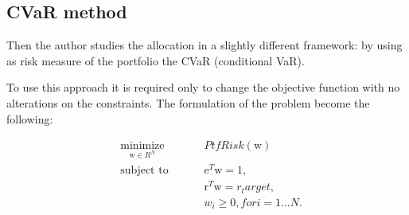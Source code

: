 \begin{table}[H]
    \caption{Results under Mean-Variance optimization, source: \citep{samuele}}
    \label{tabsamuele1}
\end{table}
\bigskip
\subsection{CVaR method}


Then the author studies the allocation in a slightly different framework: by using as risk measure of the portfolio the CVaR (conditional VaR).

To use this approach it is required only to change the objective function with no alterations on the constraints. The formulation of the problem become the following:

\begin{equation*}
\begin{aligned}
& \underset{\text{w} \in R^N}{\text{minimize}}
& & & & PtfRisk\left(\text{w}\right) \\
& \text{subject to}
& & & & \text{e}^T \text{w} = 1 \text{,} \\
&&&&& \text{r}^T \text{w} = r_target \text{,} \\
&&&&& w_i \geq 0, for i = 1...N \text{.}
\end{aligned}
\end{equation*}

